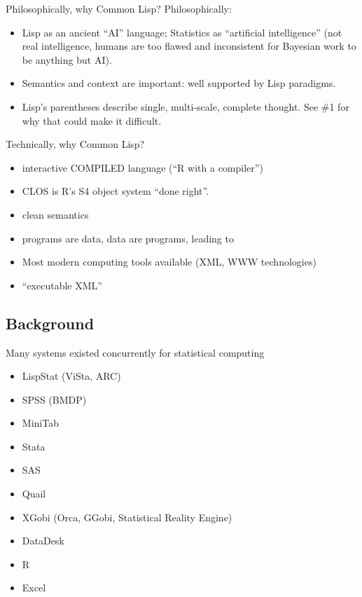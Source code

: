 \documentclass{beamer}
\begin{document}
\begin{frame}{Philosophically, why Common Lisp?}
  Philosophically:
  \begin{itemize}
  \item Lisp as an ancient ``AI'' language; Statistics as ``artificial
    intelligence'' (not real intelligence, \alert{humans are too
      flawed and inconsistent} for Bayesian work to be anything but
    AI).
  \item Semantics and context are important: well supported by Lisp
    paradigms.
  \item Lisp's parentheses describe single, multi-scale,
    \alert{complete thought}.  See \#1 for why that could make it
    difficult.
  \end{itemize}

\end{frame}

\begin{frame}{Technically, why Common Lisp?}
  \begin{itemize}
  \item interactive COMPILED language (``R with a compiler'')
  \item CLOS is R's S4 object system ``done right''.
  \item clean semantics
  \item programs are data, data are programs, leading to
  \item Most modern computing tools available (XML, WWW technologies)
  \item ``executable XML''
  \end{itemize}
\end{frame}

\subsection{Background}

\begin{frame}{Many systems existed concurrently for statistical
    computing}

  \begin{itemize}
  \item LispStat (ViSta, ARC)
  \item SPSS (BMDP)
  \item MiniTab
  \item Stata
  \item SAS
  \item Quail
  \item XGobi (Orca, GGobi, Statistical Reality Engine)
  \item DataDesk
  \item R
  \item Excel
  \end{itemize}
\end{frame}
\end{document}
